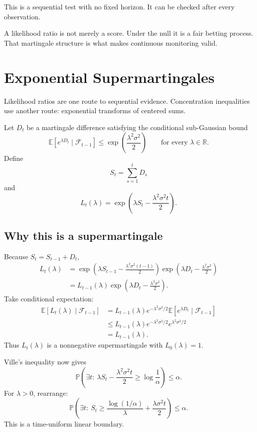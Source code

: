 \documentclass[en,nofont,11pt]{elegantbook}
\newcommand{\E}{\mathbb{E}}
\newcommand{\Pbb}{\mathbb{P}}
\newcommand{\R}{\mathbb{R}}
\newcommand{\F}{\mathcal{F}}
\begin{document}
This is a sequential test with no fixed horizon. It can be checked after every observation.

\begin{thinkbox}
A likelihood ratio is not merely a score. Under the null it is a fair betting process. That martingale structure is what makes continuous monitoring valid.
\end{thinkbox}

\chapter{Exponential Supermartingales}

Likelihood ratios are one route to sequential evidence. Concentration inequalities use another route: exponential transforms of centered sums.

Let $D_t$ be a martingale difference satisfying the conditional sub-Gaussian bound
\[
\E\left[e^{\lambda D_t}\mid\F_{t-1}\right]
\le
\exp\left(\frac{\lambda^2\sigma^2}{2}\right)
\qquad\text{for every }\lambda\in\R.
\]
Define
\[
S_t=\sum_{s=1}^{t}D_s
\]
and
\[
L_t(\lambda)
=
\exp\left(
\lambda S_t-\frac{\lambda^2\sigma^2 t}{2}
\right).
\]

\section{Why this is a supermartingale}

Because $S_t=S_{t-1}+D_t$,
\begin{align*}
L_t(\lambda)
&=\exp\left(
\lambda S_{t-1}-\frac{\lambda^2\sigma^2(t-1)}{2}
\right)
\exp\left(
\lambda D_t-\frac{\lambda^2\sigma^2}{2}
\right)\\
&=L_{t-1}(\lambda)
\exp\left(
\lambda D_t-\frac{\lambda^2\sigma^2}{2}
\right).
\end{align*}
Take conditional expectation:
\begin{align*}
\E[L_t(\lambda)\mid\F_{t-1}]
&=L_{t-1}(\lambda)e^{-\lambda^2\sigma^2/2}
\E[e^{\lambda D_t}\mid\F_{t-1}]\\
&\le L_{t-1}(\lambda)e^{-\lambda^2\sigma^2/2}
e^{\lambda^2\sigma^2/2}\\
&=L_{t-1}(\lambda).
\end{align*}
Thus $L_t(\lambda)$ is a nonnegative supermartingale with $L_0(\lambda)=1$.

Ville's inequality now gives
\[
\Pbb\left(
\exists t:\
\lambda S_t-\frac{\lambda^2\sigma^2t}{2}
\ge\log\frac1\alpha
\right)
\le\alpha.
\]
For $\lambda>0$, rearrange:
\[
\boxed{
\Pbb\left(
\exists t:\
S_t
\ge
\frac{\log(1/\alpha)}{\lambda}
+
\frac{\lambda\sigma^2t}{2}
\right)
\le\alpha.
}
\]
This is a time-uniform linear boundary.
\end{document}
